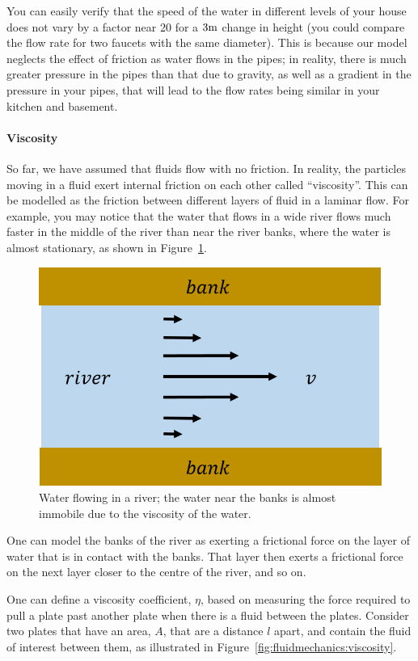\begin{framed}
\begin{framed}
You can easily verify that the speed of the water in different levels of your house does not vary by a factor near 20 for a $3 {\rm m}$ change in height (you could compare the flow rate for two faucets with the same diameter). This is because our model neglects the effect of friction as water flows in the pipes; in reality, there is much greater pressure in the pipes than that due to gravity, as well as a gradient in the pressure in your pipes, that will lead to the flow rates being similar in your kitchen and basement.
\end{framed}
\end{framed}

\paragraph{Viscosity}

So far, we have assumed that fluids flow with no friction. In reality, the particles moving in  a fluid exert internal friction on each other called ``viscosity''. This can be modelled as the friction between different layers of fluid in a laminar flow. For example, you may notice that the water that flows in a wide river flows much faster in the middle of the river than near the river banks, where the water is almost stationary, as shown in Figure~\ref{fig:fluidmechanics:river}.

\begin{figure}[!htbp]
\centering
\includegraphics[width=0.4\linewidth]{files/river-96493f15d3659429096014fa3a899881.png}
\caption[]{Water flowing in a river; the water near the banks is almost immobile due to the viscosity of the water.}
\label{fig:fluidmechanics:river}
\end{figure}

One can model the banks of the river as exerting a frictional force on the layer of water that is in contact with the banks. That layer then exerts a frictional force on the next layer closer to the centre of the river, and so on.

One can define a viscosity coefficient, $\eta$, based on measuring the force required to pull a plate past another plate when there is a fluid between the plates. Consider two plates that have an area, $A$, that are a distance $l$ apart, and contain the fluid of interest between them, as illustrated in Figure~\ref{fig:fluidmechanics:viscosity}.

